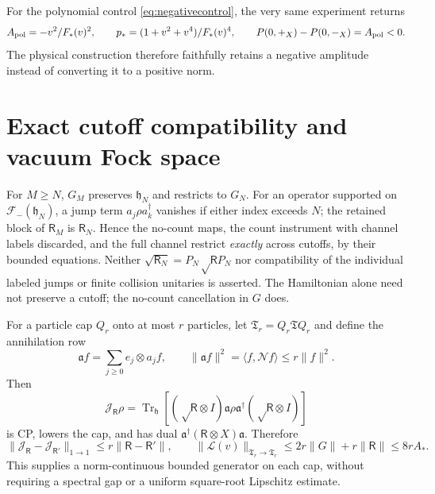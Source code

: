 \documentclass[11pt,letterpaper]{article}
\numberwithin{equation}{section}
\theoremstyle{remark}
\DeclareMathOperator{\Tr}{Tr}
\newcommand{\ip}[2]{\langle #1,#2\rangle}
\newcommand{\loss}{\mathsf R}
\newcommand{\Fock}{\mathcal F_-}
\begin{document}
For the polynomial control \eqref{eq:negativecontrol}, the very same
experiment returns
\begin{equation}
 A_{\rm pol}=-v^2/F_*(v)^2,\qquad
 p_*=(1+v^2+v^4)/F_*(v)^4,\qquad
 P(0,+_X)-P(0,-_X)=A_{\rm pol}<0. \label{eq:controlreadout}
\end{equation}
The physical construction therefore faithfully retains a negative
amplitude instead of converting it to a positive norm.

\section{Exact cutoff compatibility and vacuum Fock space}
\label{sec:extension}
For $M\ge N$, $G_M$ preserves $\mathfrak h_N$ and restricts to $G_N$.
For an operator supported on $\Fock(\mathfrak h_N)$, a jump term
$a_j\rho a_k^\dagger$ vanishes if either index exceeds $N$; the retained
block of $\loss_M$ is $\loss_N$. Hence the no-count maps, the count
instrument with channel labels discarded, and the full channel
restrict \emph{exactly} across cutoffs, by their bounded equations.
Neither $\sqrt{\loss_N}=P_N\sqrt\loss P_N$ nor compatibility of the
individual labeled jumps or finite collision unitaries is asserted.
The Hamiltonian alone need not preserve a cutoff; the no-count
cancellation in $G$ does.

For a particle cap $Q_r$ onto at most $r$ particles, let
$\mathfrak T_r=Q_r\mathfrak TQ_r$ and define the annihilation row
\begin{equation}
 \mathfrak a f=\sum_{j\ge0}e_j\otimes a_jf,
 \qquad \|\mathfrak a f\|^2=\ip f{\mathcal N f}\le r\|f\|^2.
\end{equation}
Then
\begin{equation}
 \mathcal J_{\loss}\rho=\Tr_{\mathfrak h}
 [ (\sqrt\loss\otimes I)\mathfrak a\rho\mathfrak a^\dagger
   (\sqrt\loss\otimes I)] \label{eq:infinitejump}
\end{equation}
is CP, lowers the cap, and has dual
$\mathfrak a^\dagger(\loss\otimes X)\mathfrak a$. Therefore
\begin{equation}
 \|\mathcal J_{\loss}-\mathcal J_{\loss'}\|_{1\to1}
 \le r\|\loss-\loss'\|,
 \qquad \|\mathcal L(v)\|_{\mathfrak T_r\to\mathfrak T_r}
 \le2r\|G\|+r\|\loss\|\le8rA_*. \label{eq:capbound}
\end{equation}
This supplies a norm-continuous bounded generator on each cap, without
requiring a spectral gap or a uniform square-root Lipschitz estimate.
\end{document}
